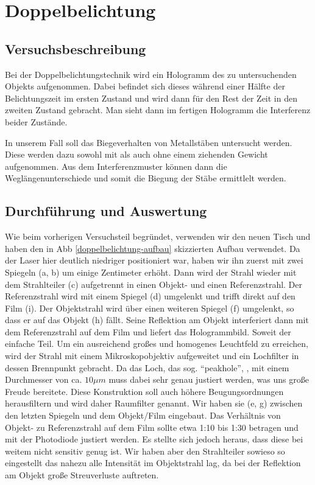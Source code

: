 \section{Doppelbelichtung}
\subsection{Versuchsbeschreibung}

Bei der Doppelbelichtungstechnik wird ein Hologramm des zu untersuchenden Objekts aufgenommen. Dabei befindet sich dieses während einer Hälfte der Belichtungszeit im ersten Zustand und wird dann für den Rest der Zeit in den zweiten Zustand gebracht. Man sieht dann im fertigen Hologramm die Interferenz beider Zustände.

In unserem Fall soll das Biegeverhalten von Metallstäben untersucht werden. Diese werden dazu sowohl mit als auch ohne einem ziehenden Gewicht aufgenommen. Aus dem Interferenzmuster können dann die Weglängenunterschiede und somit die Biegung der Stäbe ermittlelt werden. 

\subsection{Durchführung und Auswertung}

Wie beim vorherigen Versuchsteil begründet, verwenden wir den neuen Tisch und haben den in Abb \ref{doppelbelichtung-aufbau} skizzierten Aufbau verwendet. Da der Laser hier deutlich niedriger positioniert war, haben wir ihn zuerst mit zwei Spiegeln (a, b) um einige Zentimeter erhöht. Dann wird der Strahl wieder mit dem Strahlteiler (c) aufgetrennt in einen Objekt- und einen Referenzstrahl. Der Referenzstrahl wird mit einem Spiegel (d) umgelenkt und trifft direkt auf den Film (i). Der Objektstrahl wird über einen weiteren Spiegel (f) umgelenkt, so dass er auf das Objekt (h) fällt. Seine Reflektion am Objekt interferiert dann mit dem Referenzstrahl auf dem Film und liefert das Hologrammbild. Soweit der einfache Teil. Um ein ausreichend großes und homogenes Leuchtfeld zu erreichen, wird der Strahl mit einem Mikroskopobjektiv aufgeweitet und ein Lochfilter in dessen Brennpunkt gebracht. Da das Loch, das sog. "`peakhole"', %
, mit einem Durchmesser von ca. $10\mu m$ muss dabei sehr genau justiert werden, was uns große Freude bereitete. Diese Konstruktion soll auch höhere Beugungsordnungen herausfiltern und wird daher Raumfilter genannt. Wir haben sie (e, g) zwischen den letzten Spiegeln und dem Objekt/Film eingebaut. Das Verhältnis von Objekt- zu Referenzstrahl auf dem Film sollte etwa 1:10 bis 1:30 betragen und mit der Photodiode justiert werden. Es stellte sich jedoch heraus, dass diese bei weitem nicht sensitiv genug ist. Wir haben aber den Strahlteiler sowieso so eingestellt das nahezu alle Intensität im Objektstrahl lag, da bei der Reflektion am Objekt große Streuverluste auftreten. 

